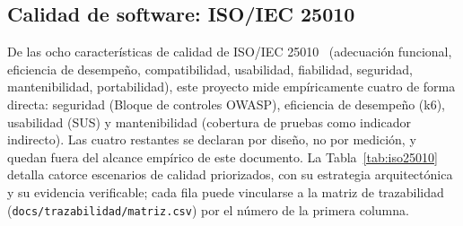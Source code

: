 \documentclass[11pt,a4paper]{article}
\newcommand{\ruta}[1]{\texttt{\footnotesize #1}}
\begin{document}
\subsection{Calidad de software: ISO/IEC 25010}

De las ocho características de calidad de ISO/IEC 25010~\cite{iso25010}
(adecuación funcional, eficiencia de desempeño, compatibilidad, usabilidad,
fiabilidad, seguridad, mantenibilidad, portabilidad), este proyecto mide
empíricamente cuatro de forma directa: seguridad (Bloque de controles
OWASP), eficiencia de desempeño (k6), usabilidad (SUS) y mantenibilidad
(cobertura de pruebas como indicador indirecto). Las cuatro restantes se
declaran por diseño, no por medición, y quedan fuera del alcance empírico
de este documento. La Tabla~\ref{tab:iso25010} detalla catorce
escenarios de calidad priorizados, con su estrategia arquitectónica y su
evidencia verificable; cada fila puede vincularse a la matriz de
trazabilidad (\ruta{docs/trazabilidad/matriz.csv}) por el número de la
primera columna.
\end{document}
